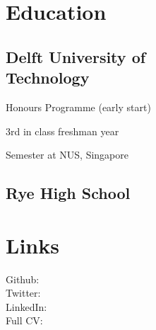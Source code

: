 \documentclass[]{deedy-resume-openfont}
\begin{document}

%
%

%
%
\begin{minipage}[t]{0.33\textwidth} 

\section{Education} 

\subsection{Delft University of \\Technology}
\vspace{\topsep}
\begin{tightemize}
    \item Honours Programme (early start)
    \item 3rd in class freshman year
    \item Semester at NUS, Singapore
\end{tightemize}
\vspace{\topsep}

\subsection{Rye High School}
\sectionsep


\section{Links} 
Github: \href{https://github.com/leonoverweel}{} \\
Twitter: \href{https://twitter.com/layon_overwhale}{} \\
LinkedIn: \href{https://www.linkedin.com/in/leonoverweel}{} \\
Full CV: \href{https://leonoverweel.github.io/resume/}{} \\
\sectionsep


\end{minipage}
\end{document}
